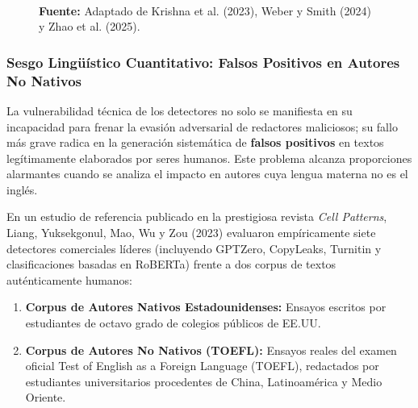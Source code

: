 \begin{figure}[htpb!]
\begin{tcolorbox}[colback=white, colframe=unmsm_gold, arc=3pt, boxrule=0.8pt, top=0.3cm, bottom=0.3cm, left=0.4cm, right=0.4cm]
{%
}\\[0.15cm]
\raggedright
\scriptsize \textbf{Fuente:} Adaptado de Krishna et al. (2023), Weber y Smith (2024) y Zhao et al. (2025).
\end{tcolorbox}
\end{figure}

\subsubsection{Sesgo Lingüístico Cuantitativo: Falsos Positivos en Autores No Nativos}

La vulnerabilidad técnica de los detectores no solo se manifiesta en su incapacidad para frenar la evasión adversarial de redactores maliciosos; su fallo más grave radica en la generación sistemática de \textbf{falsos positivos} en textos legítimamente elaborados por seres humanos. Este problema alcanza proporciones alarmantes cuando se analiza el impacto en autores cuya lengua materna no es el inglés.

En un estudio de referencia publicado en la prestigiosa revista \textit{Cell Patterns}, Liang, Yuksekgonul, Mao, Wu y Zou (2023) evaluaron empíricamente siete detectores comerciales líderes (incluyendo GPTZero, CopyLeaks, Turnitin y clasificaciones basadas en RoBERTa) frente a dos corpus de textos auténticamente humanos:
\begin{enumerate}
    \item \textbf{Corpus de Autores Nativos Estadounidenses:} Ensayos escritos por estudiantes de octavo grado de colegios públicos de EE.UU.
    \item \textbf{Corpus de Autores No Nativos (TOEFL):} Ensayos reales del examen oficial Test of English as a Foreign Language (TOEFL), redactados por estudiantes universitarios procedentes de China, Latinoamérica y Medio Oriente.
\end{enumerate}

